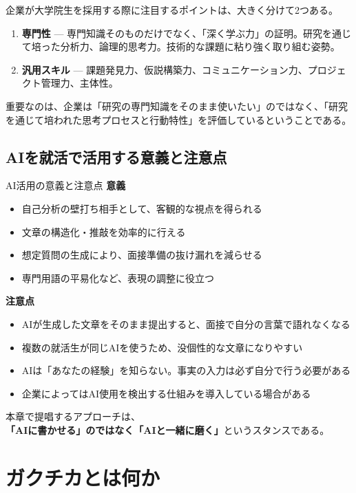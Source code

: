 企業が大学院生を採用する際に注目するポイントは、大きく分けて2つある。

\begin{enumerate}
\item \textbf{専門性} --- 専門知識そのものだけでなく、「深く学ぶ力」の証明。研究を通じて培った分析力、論理的思考力。技術的な課題に粘り強く取り組む姿勢。
\item \textbf{汎用スキル} --- 課題発見力、仮説構築力、コミュニケーション力、プロジェクト管理力、主体性。
\end{enumerate}

重要なのは、企業は「研究の専門知識をそのまま使いたい」のではなく、「研究を通じて培われた思考プロセスと行動特性」を評価しているということである。

\subsection*{AIを就活で活用する意義と注意点}

\begin{itembox}[l]{AI活用の意義と注意点}
\textbf{意義}
\begin{itemize}
\item 自己分析の壁打ち相手として、客観的な視点を得られる
\item 文章の構造化・推敲を効率的に行える
\item 想定質問の生成により、面接準備の抜け漏れを減らせる
\item 専門用語の平易化など、表現の調整に役立つ
\end{itemize}

\textbf{注意点}
\begin{itemize}
\item AIが生成した文章をそのまま提出すると、面接で自分の言葉で語れなくなる
\item 複数の就活生が同じAIを使うため、没個性的な文章になりやすい
\item AIは「あなたの経験」を知らない。事実の入力は必ず自分で行う必要がある
\item 企業によってはAI使用を検出する仕組みを導入している場合がある
\end{itemize}
\end{itembox}

本章で提唱するアプローチは、\textbf{「AIに書かせる」のではなく「AIと一緒に磨く」}というスタンスである。

\section{ガクチカとは何か}

